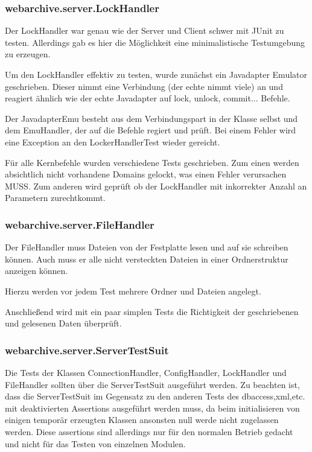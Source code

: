 	\subsubsection{webarchive.server.LockHandler}
		Der LockHandler war genau wie der Server und Client schwer mit JUnit zu testen.
		Allerdings gab es hier die Möglichkeit eine minimalistische Testumgebung zu erzeugen.
		
		Um den LockHandler effektiv zu testen, wurde zunächst ein Javadapter Emulator geschrieben.
		Dieser nimmt eine Verbindung (der echte nimmt viele) an und reagiert ähnlich wie der echte Javadapter auf lock, unlock, commit... Befehle.
		
		Der JavadapterEmu besteht aus dem Verbindungspart in der Klasse selbst und dem EmuHandler, der auf die Befehle regiert und prüft. 
		Bei einem Fehler wird eine Exception an den LockerHandlerTest wieder gereicht.
		
		Für alle Kernbefehle wurden verschiedene Tests geschrieben. 
		Zum einen werden absichtlich nicht vorhandene Domains gelockt, was einen Fehler verursachen MUSS.
		Zum anderen wird geprüft ob der LockHandler mit inkorrekter Anzahl an Parametern zurechtkommt.
	\subsubsection{webarchive.server.FileHandler}
		Der FileHandler muss Dateien von der Festplatte lesen und auf sie schreiben können.
		Auch muss er alle nicht versteckten Dateien in einer Ordnerstruktur anzeigen können.
		
		Hierzu werden vor jedem Test mehrere Ordner und Dateien angelegt.
		
		Anschließend wird mit ein paar simplen Tests die Richtigkeit der geschriebenen und gelesenen Daten überprüft.
		
	\subsubsection{webarchive.server.ServerTestSuit}
		Die Tests der Klassen ConnectionHandler, ConfigHandler, LockHandler und FileHandler sollten über die ServerTestSuit ausgeführt werden.
		Zu beachten ist, dass die ServerTestSuit im Gegensatz zu den anderen Tests des dbaccess,xml,etc. mit deaktivierten Assertions ausgeführt werden muss, da beim initialisieren von einigen temporär erzeugten Klassen ansonsten null werde nicht zugelassen werden.
		Diese assertions sind allerdings nur für den normalen Betrieb gedacht und nicht für das Testen von einzelnen Modulen.
		